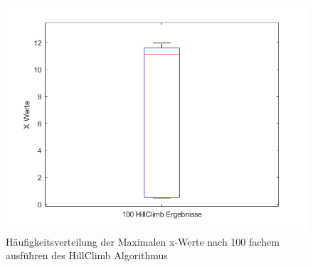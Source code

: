 \documentclass{hbrs-ecta-report}
\begin{document}
\begin{figure}[h!]
	\includegraphics[width=0.8\linewidth]{img/Boxplot_of_100HillClimbs.png}
	\caption{Häufigkeitsverteilung der Maximalen x-Werte nach 100 fachem ausführen des HillClimb Algorithmus}
	\label{fig:boxplot} 
\end{figure}
\end{document}
